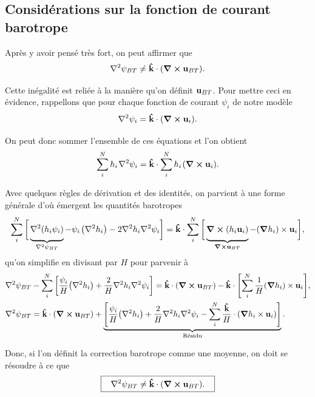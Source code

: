 \documentclass[10pt]{article}
\numberwithin{equation}{section}
\newcommand{\kvf}{\vb{\hat{k}}}
\newcommand{\uu}{\vb{u}}
\newcommand{\grande}{\vphantom{\frac{1}{xx}}}
\newcommand{\pt}{\hspace{1pt}} %
\begin{document}
\subsection{Considérations sur la fonction de courant barotrope}
\label{sec:orge61fbc0}
Après y avoir pensé très fort, on peut affirmer que
\begin{equation}
   \laplacian{\psi_{BT}} \not= \kvf\cdot\qty(\curl{\uu_{BT}}).
\end{equation}

Cette inégalité est reliée à la manière qu'on définit \(\uu_{BT}\).
Pour mettre ceci en évidence, rappellons que pour chaque fonction de courant \(\psi_i\) de notre modèle
\begin{equation}
   \laplacian{\psi_i} = \kvf\cdot\qty(\curl{\uu_i}).
\end{equation}

On peut donc sommer l'ensemble de ces équations et l'on obtient
\begin{equation}
   \sum_i^Nh_i\pt\laplacian{\psi_i} = \kvf\cdot \sum_i^N h_i\pt \qty(\curl{\uu_i}).
\end{equation}

Avec quelques règles de dérivation et des identités, on parvient à une forme générale d'où émergent les quantités barotropes
\begin{align}
   \sum_i^N \bigg[ \underbrace{\grande\laplacian(h_i\psi_i)}_{\laplacian{\psi_{BT}}} - \psi_i\pt\qty(\laplacian{h_i}) - 2 \laplacian{h_i}\laplacian{\psi_i}\bigg]
    = \kvf\cdot \sum_i^N \bigg[ \underbrace{\grande\curl(h_i \uu_i)}_{\curl{\uu_{BT}}}  - \qty(\gradient{h_i})\times\uu_i\bigg],
\end{align}
qu'on simplifie en divisant par \(H\) pour parvenir à
\begin{align}
\label{eq:org7364e07}
   &\laplacian{\psi_{BT}} - \sum_i^N \bigg[ \frac{\psi_i}{H} \qty(\laplacian{h_i}) + \frac{2}{H} \laplacian{h_i}\laplacian{\psi_i}\bigg]
    = \kvf\cdot  \qty(\curl{ \uu_{BT}}) - \kvf\cdot \qty[\sum_i^N \frac{1}{H} \qty(\gradient{h_i})\times\uu_i],\nonumber\\
%
   &\laplacian{\psi_{BT}}
    = \kvf\cdot  \qty(\curl{ \uu_{BT}}) + \underbrace{\qty[ \frac{\psi_i}{H} \qty(\laplacian{h_i}) + \frac{2}{H} \laplacian{h_i}\laplacian{\psi_i}  -
\sum_i^N \frac{\kvf}{H}\cdot\qty(\gradient{h_i}\times\uu_i)]}_\text{Résidu}.
\end{align}

Donc, si l'on définit la correction barotrope comme une moyenne, on doit se résoudre à ce que
\begin{equation}
\label{eq:orgc9239ae}
   \boxed{\hspace{0.3cm}\laplacian{\psi_{BT}} \not= \kvf\cdot  \qty(\curl{ \uu_{BT}}).\hspace{0.3cm}}
\end{equation}
\end{document}
